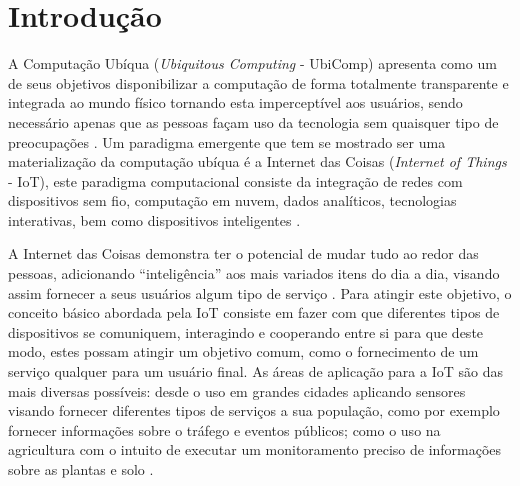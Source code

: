 \documentclass[ti,table]{texufpel} %
\begin{document}
  


\tableofcontents 

  



\chapter{Introdução} 

  

A Computação Ubíqua (\textit{Ubiquitous Computing} - UbiComp) apresenta como um de seus objetivos  disponibilizar a computação de forma totalmente transparente e integrada ao mundo físico tornando esta imperceptível aos usuários, sendo necessário apenas que as pessoas façam uso da tecnologia sem quaisquer tipo de preocupações \cite{weiser1999computer}. Um paradigma emergente que tem se mostrado ser uma materialização da computação ubíqua é a Internet das Coisas (\textit{Internet of Things} - IoT), este paradigma computacional consiste da integração de redes com dispositivos sem fio, computação em nuvem, dados analíticos, tecnologias interativas, bem como dispositivos inteligentes \cite{ashton2009internet}.  

  

A Internet das Coisas demonstra ter o potencial de mudar tudo ao redor das pessoas, adicionando ``inteligência'' aos mais variados itens do dia a dia, visando assim fornecer a seus usuários algum tipo de serviço \cite{bandyopadhyay2011internet}. Para atingir este objetivo, o conceito básico abordada pela IoT consiste em fazer com que diferentes tipos de dispositivos se comuniquem, interagindo e cooperando entre si para que deste modo, estes possam atingir um objetivo comum, como o fornecimento de um serviço qualquer para um usuário final. As áreas de aplicação para a IoT são das mais diversas possíveis: desde o uso em grandes cidades aplicando sensores visando fornecer diferentes tipos de serviços a sua população, como por exemplo fornecer informações sobre o tráfego e eventos públicos; como o uso na agricultura com o intuito de executar um monitoramento preciso de  informações sobre as plantas e solo \cite{gonccalves2017research}. 

  
\end{document}

